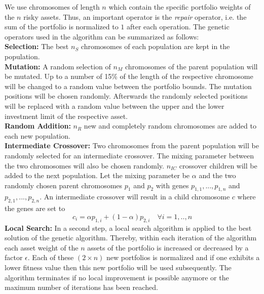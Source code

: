 {We use chromosomes of length $n$ which contain the specific portfolio weights of the $n$ risky assets. Thus, an important operator is the \textit{repair} operator, i.e. the sum of the portfolio is normalized to $1$ after each operation. The genetic operators used in the algorithm can be summarized as follows:\\[1\baselineskip]
\textbf{Selection: }The best $n_S$ chromosomes of each population are kept in the population.\\[1\baselineskip]
\textbf{Mutation: }A random selection of $n_M$ chromosomes of the parent population will be mutated. Up to a number of 15\% of the length of the respective chromosome will be changed to a random
value between the portfolio bounds. The mutation positions will be chosen randomly. Afterwards the randomly selected positions will be replaced with a random value between the upper and the lower investment limit of the respective asset.\\[1\baselineskip]
\textbf{Random Addition: }$n_R$ new and completely random chromosomes are added to each new population.\\[1\baselineskip]
\textbf{Intermediate Crossover: }Two chromosomes from the parent population will be randomly selected for an intermediate crossover. The mixing parameter between the two chromosomes will also be chosen randomly. $n_{IC}$ crossover children will be added to the next population. Let the mixing parameter be $\alpha$ and the two randomly chosen parent chromosomes $p_1$ and $p_2$ with genes $p_{1,1},...,p_{1,n}$ and $p_{2,1},...,p_{2,n}$. An intermediate crossover will result in a child chromosome $c$ where the genes are set to
\begin{equation}
c_i = \alpha p_{1,i} + (1-\alpha)p_{2,i} \hspace{1em} \forall i=1,..,n
\end{equation}
\textbf{Local Search: }In a second step, a local search algorithm is applied to the best solution of the genetic algorithm. Thereby, within each iteration of the algorithm each asset weight of the $n$ assets of the portfolio is increased or decreased by a factor $\epsilon$. Each of these $(2\times n)$ new portfolios is normalized and if one exhibits a lower fitness value then this new portfolio will be used subsequently. The algorithm terminates if no local improvement is possible anymore or the maximum number of iterations
has been reached.

}
